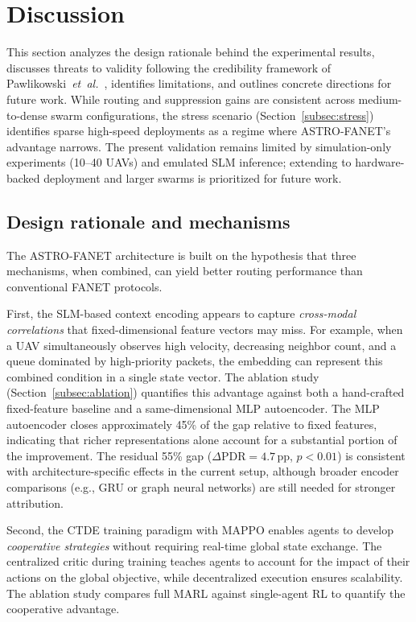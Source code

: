 \documentclass[5p,times]{elsarticle}
\begin{document}
\section{Discussion}
\label{sec:discussion}

This section analyzes the design rationale behind the experimental results, discusses threats to validity following the credibility framework of Pawlikowski~\textit{et~al.}~\cite{pawlikowski2002credibility}, identifies limitations, and outlines concrete directions for future work.
While routing and suppression gains are consistent across medium-to-dense swarm configurations, the stress scenario (Section~\ref{subsec:stress}) identifies sparse high-speed deployments as a regime where ASTRO-FANET's advantage narrows. The present validation remains limited by simulation-only experiments (10--40 UAVs) and emulated SLM inference; extending to hardware-backed deployment and larger swarms is prioritized for future work.

\subsection{Design rationale and mechanisms}

The ASTRO-FANET architecture is built on the hypothesis that three mechanisms, when combined, can yield better routing performance than conventional FANET protocols.

First, the SLM-based context encoding appears to capture \emph{cross-modal correlations} that fixed-dimensional feature vectors may miss. For example, when a UAV simultaneously observes high velocity, decreasing neighbor count, and a queue dominated by high-priority packets, the embedding can represent this combined condition in a single state vector. The ablation study (Section~\ref{subsec:ablation}) quantifies this advantage against both a hand-crafted fixed-feature baseline and a same-dimensional MLP autoencoder. The MLP autoencoder closes approximately 45\% of the gap relative to fixed features, indicating that richer representations alone account for a substantial portion of the improvement. The residual 55\% gap ($\Delta\mathrm{PDR} = 4.7$\,pp, $p < 0.01$) is consistent with architecture-specific effects in the current setup, although broader encoder comparisons (e.g., GRU or graph neural networks) are still needed for stronger attribution.

Second, the CTDE training paradigm with MAPPO enables agents to develop \emph{cooperative strategies} without requiring real-time global state exchange. The centralized critic during training teaches agents to account for the impact of their actions on the global objective, while decentralized execution ensures scalability. The ablation study compares full MARL against single-agent RL to quantify the cooperative advantage.
\end{document}
